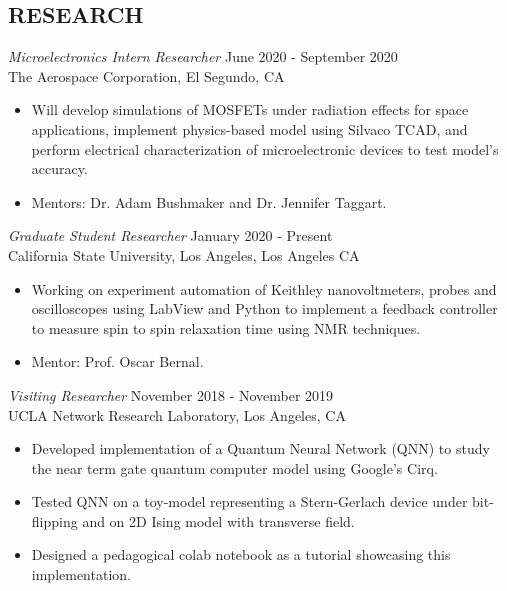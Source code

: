 \documentclass[margin,line]{res}
\let\origsection\section%
\let\section\subsection%
\let\section\origsection%
\begin{document}
\begin{resume}
\section{ \mysidestyle  RESEARCH} 
{\sl Microelectronics Intern Researcher} \hfill June 2020 - September 2020 \\
The Aerospace Corporation, El Segundo, CA
				\begin{itemize}
				\itemsep -2pt
\item Will develop simulations of MOSFETs under radiation effects for space applications, implement physics-based model using Silvaco TCAD, and perform electrical characterization of microelectronic devices to test model's accuracy. 
\item Mentors: Dr. Adam Bushmaker and Dr. Jennifer Taggart.
					\end{itemize}
					

{\sl Graduate Student Researcher} \hfill January 2020 - Present\\
California State University, Los Angeles, Los Angeles CA
				\begin{itemize}
					\itemsep -2pt
					\item Working on experiment automation of Keithley nanovoltmeters, probes and oscilloscopes using LabView and Python to implement a feedback controller to measure spin to spin relaxation time using NMR techniques.
					\item Mentor: Prof. Oscar Bernal.
					\end{itemize}


{\sl Visiting Researcher} \hfill November 2018 - November 2019 \\
				UCLA Network Research Laboratory, 
                Los Angeles, CA 
				\begin{itemize}
					\itemsep -2pt
					\item Developed implementation of a Quantum Neural Network (QNN) to study the near term gate quantum computer model using Google's Cirq.  
					\item Tested QNN on a toy-model representing a Stern-Gerlach device under bit-flipping and on 2D Ising model with transverse field.
					\item Designed a pedagogical colab notebook as a tutorial showcasing this implementation.
				\end{itemize}


\end{resume}
\end{document}

